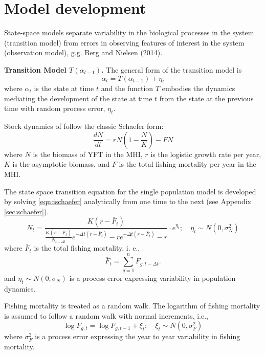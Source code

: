 \documentclass[12pt,letterpaper,twoside]{article}
\begin{document}
\clearpage

\appendix
\section{Model development}
\label{sec:models}
State-space models separate variability in the biological
processes in the system (transition model)
from errors in observing features of interest
in the system (observation model), g.g. Berg and Nielsen (2014). 

{\bf Transition Model $T(\alpha_{t-1})$.}
The general form of the transition model is
\begin{equation}
\alpha_t=T(\alpha_{t-1}) + \eta_t
\end{equation}
where $\alpha_t$ is the state at time $t$ and 
the function $T$ embodies the dynamics mediating the
development of the state at time $t$ from the state at the previous
time with random process error, $\eta_t$.

Stock dynamics of follow the classic Schaefer form:
\begin{equation}
\label{eqn:ischaefer}
\frac{dN}{dt} = rN(1-\frac{N}{K}) - FN
\end{equation}
where $N$ is the biomass of YFT in the MHI, 
$r$ is the logistic growth rate per year,
$K$ is the asymptotic biomass, and
$F$ is the total fishing mortality per year in the MHI.

The state space transition equation for the single population model is
developed by solving \ref{eqn:ischaefer} analytically from one time to
the next (see Appendix \ref{sec:schaefer}).
\begin{equation}
\label{eqn:intschaeferA}
N_t = \frac{K(r-\bar{F}_t)}{\frac{K(r-\bar{F}_t)}{N_{t-\Delta t}}e^{-\Delta
t(r-\bar{F}_t)}-re^{-\Delta t(r-\bar{F}_t)} -r} \cdot e^{\eta_t};
\quad \eta_t\sim N(0,\sigma^2_N)
\end{equation}
where 
$\bar{F}_t$ is the total fishing mortality, i. e.,
$$
\bar{F}_t =\sum_{g=1}^n F_{g,t-\Delta t}.
$$
and $\eta_t \sim N(0,\sigma_N)$ is a process error expressing
variability in population dynamics.

Fishing mortality is treated as a random walk.
The logarithm of fishing mortality is assumed to
follow a random walk with normal increments, i.e.,
\begin{equation}
\label{eqn:Fwalk}
\log F_{g,t} = \log F_{g,t-1} + \xi_t;\quad \xi_t\sim
N(0,\sigma^2_F)
\end{equation}
where  $\sigma^2_F$ is a process error expressing the year to year
variability in fishing mortality.
\end{document}

